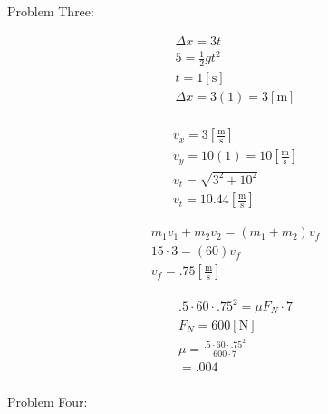 \documentclass[12pt]{article}
\begin{document}
    \hline

    \newpage

\begin{center}
  Problem Three:
\end{center}

\hline

\begin{equation}
  \begin{split}
    \Delta x=3t\\
    5=\frac{1}{2}gt^2\\
    t=1[\si{\second}]\\
    \Delta x= 3(1)=3[\si{\meter}]\\
  \end{split}
  \label{9}
\end{equation}

\begin{equation}
  \begin{split}
    v_x=3\left[ \frac{\si{\meter}}{\si{\second}} \right]\\
    v_y=10(1)=10\left[ \frac{\si{\meter}}{\si{\second}} \right]\\
    v_t=\sqrt{3^2+10^2}\\
    v_t=10.44\left[ \frac{\si{\meter}}{\si{\second}} \right]
  \end{split}
  \label{10}
\end{equation}

\begin{equation}
  \begin{split}
    m_1v_1+m_2v_2=(m_1+m_2)v_f\\
    15\cdot3=(60)v_f\\
    v_f=.75\left[ \frac{\si{\meter}}{\si{\second}} \right]
  \end{split}
  \label{11}
\end{equation}

\begin{equation}
  \begin{split}
    .5\cdot60\cdot.75^2=\mu F_N\cdot7\\
    F_N=600[\si{\newton}]\\
    \mu=\frac{.5\cdot60\cdot.75^2}{600\cdot7}\\
    =.004\\
  \end{split}
  \label{12}
\end{equation}

\hline

\newpage

\begin{center}
  Problem Four:
\end{center}
\end{document}
